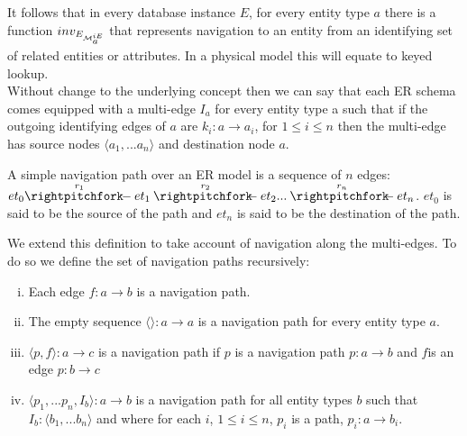 \documentclass[10pt,a4paper]{article}
\newcommand{\genericmodel}{\mathcal{M}}
\newcommand{\allIdentifying}{\genericmodel^{iE}}
\newcommand{\idEdges}[1]{\allIdentifying_{\raisebox{2pt}{$\scriptstyle{#1}$}}}
\begin{document}
\noindent It follows that in every database instance $E$, for every entity type $a$ there is a function 
$inv_{E_{\idEdges{a}}}$ that represents navigation to an entity from an identifying set of related entities or attributes. 
In a physical model this will equate to keyed lookup. \\

\noindent Without change to the underlying concept then we can say that each ER schema comes equipped with a multi-edge $I_a$ for every entity type a such that if 
the outgoing identifying edges of $a$ are $k_i: a \rightarrow a_i$, for $1 \leq i \leq n$  then the multi-edge has source nodes $\langle a_1,...a_n\rangle$ and destination node $a$.  

\noindent A simple navigation path over an ER model  is a
sequence of  $n$ edges:
$\overset{r_1}{et_0 \rightpitchfork \hspace{-0.35em} -  et_1} \overset{r_2}{\rightpitchfork \hspace{-0.35em} -} et_2 ... \overset{r_n}{\rightpitchfork \hspace{-0.35em} -} et_n$.  $et_0$ is said to be the source of the path and $et_n$ is said to be the destination of the path. 

\noindent We extend this definition to take account of navigation along the multi-edges. To do so we define the set of navigation paths recursively:

\begin{enumerate} [(i)]
\item{ Each edge $f: a \rightarrow b$ is a navigation path.
}
\item{ The empty sequence  $\langle \rangle : a \rightarrow a$ is a navigation path for every entity type $a$.
}
\item{ $\langle p,f \rangle : a \rightarrow c$ is a navigation path  if $p$ is a navigation path $p: a \rightarrow b$ and $f $is an edge $p: b \rightarrow c$
}
\item{ $\langle p_1,...p_n,I_b\rangle : a \rightarrow b$ is a navigation path for all entity types $b$ such that $I_b: \langle b_1,...b_n\rangle$ and where
for each $i$, $1 \leq i \leq n$, $p_i$ is a path, $p_i: a \rightarrow b_i$.   
}
\end{enumerate}
\end{document}
